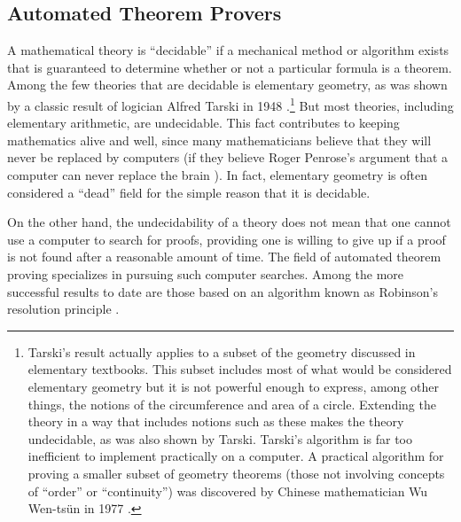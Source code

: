 \subsection{Automated Theorem Provers}\label{theoremprovers}

A mathematical theory is ``decidable'' if a mechanical
method or algorithm exists that is guaranteed to determine whether or not a
particular formula is a theorem.  Among the few theories that are decidable is
elementary geometry, as was shown by a classic
result of logician Alfred Tarski in 1948
\cite{Tarski}.\footnote{Tarski's result actually applies to a subset of the
geometry discussed in elementary textbooks.  This subset includes most of what
would be considered elementary geometry but it is not powerful enough to
express, among other things, the notions of the circumference and area of a
circle.  Extending the theory in a way that includes notions such as these
makes the theory undecidable, as was also shown by Tarski.  Tarski's algorithm
is far too inefficient to implement practically on a computer.  A practical
algorithm for proving a smaller subset of geometry theorems (those not
involving concepts of ``order'' or ``continuity'') was discovered by Chinese
mathematician Wu Wen-ts\"{u}n in 1977 \cite{Chou}.}  But most theories, including
elementary arithmetic, are undecidable.  This fact contributes to keeping
mathematics alive and well, since many mathematicians believe
that they will never be
replaced by computers (if they believe Roger Penrose's argument that a
computer can never replace the brain \cite{Penrose}).
In fact,  elementary geometry is often considered a ``dead'' field
for the simple reason that it is decidable.

On the other hand, the undecidability of a theory does not mean that one cannot
use a computer to search for proofs, providing one is willing to give up if a
proof is not found after a reasonable amount of time.  The field of automated
theorem proving specializes in pursuing such
computer searches.  Among the more successful results to date are those based
on an algorithm known as Robinson's resolution principle
\cite{Robinson}.

